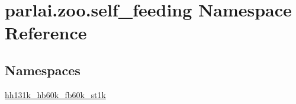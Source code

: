 \hypertarget{namespaceparlai_1_1zoo_1_1self__feeding}{}\section{parlai.\+zoo.\+self\+\_\+feeding Namespace Reference}
\label{namespaceparlai_1_1zoo_1_1self__feeding}
\subsection*{Namespaces}
\begin{DoxyCompactItemize}
\item 
 \hyperlink{namespaceparlai_1_1zoo_1_1self__feeding_1_1hh131k__hb60k__fb60k__st1k}{hh131k\+\_\+hb60k\+\_\+fb60k\+\_\+st1k}
\end{DoxyCompactItemize}
